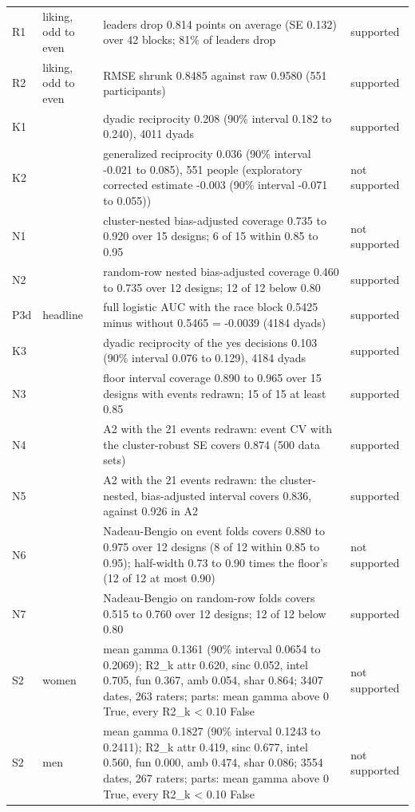 \documentclass[11pt]{article}
\begin{document}
\begin{longtable}{lL{2.6cm}L{9.6cm}l}
R1 & liking, odd to even & leaders drop 0.814 points on average (SE 0.132) over 42 blocks; 81\% of leaders drop & supported \\
R2 & liking, odd to even & RMSE shrunk 0.8485 against raw 0.9580 (551 participants) & supported \\
K1 &  & dyadic reciprocity 0.208 (90\% interval 0.182 to 0.240), 4011 dyads & supported \\
K2 &  & generalized reciprocity 0.036 (90\% interval -0.021 to 0.085), 551 people (exploratory corrected estimate -0.003 (90\% interval -0.071 to 0.055)) & not supported \\
N1 &  & cluster-nested bias-adjusted coverage 0.735 to 0.920 over 15 designs; 6 of 15 within 0.85 to 0.95 & not supported \\
N2 &  & random-row nested bias-adjusted coverage 0.460 to 0.735 over 12 designs; 12 of 12 below 0.80 & supported \\
P3d & headline & full logistic AUC with the race block 0.5425 minus without 0.5465 = -0.0039 (4184 dyads) & supported \\
K3 &  & dyadic reciprocity of the yes decisions 0.103 (90\% interval 0.076 to 0.129), 4184 dyads & supported \\
N3 &  & floor interval coverage 0.890 to 0.965 over 15 designs with events redrawn; 15 of 15 at least 0.85 & supported \\
N4 &  & A2 with the 21 events redrawn: event CV with the cluster-robust SE covers 0.874 (500 data sets) & supported \\
N5 &  & A2 with the 21 events redrawn: the cluster-nested, bias-adjusted interval covers 0.836, against 0.926 in A2 & supported \\
N6 &  & Nadeau-Bengio on event folds covers 0.880 to 0.975 over 12 designs (8 of 12 within 0.85 to 0.95); half-width 0.73 to 0.90 times the floor's (12 of 12 at most 0.90) & not supported \\
N7 &  & Nadeau-Bengio on random-row folds covers 0.515 to 0.760 over 12 designs; 12 of 12 below 0.80 & supported \\
S2 & women & mean gamma 0.1361 (90\% interval 0.0654 to 0.2069); R2\_k attr 0.620, sinc 0.052, intel 0.705, fun 0.367, amb 0.054, shar 0.864; 3407 dates, 263 raters; parts: mean gamma above 0 True, every R2\_k < 0.10 False & not supported \\
S2 & men & mean gamma 0.1827 (90\% interval 0.1243 to 0.2411); R2\_k attr 0.419, sinc 0.677, intel 0.560, fun 0.000, amb 0.474, shar 0.086; 3554 dates, 267 raters; parts: mean gamma above 0 True, every R2\_k < 0.10 False & not supported \\

\end{longtable}
\end{document}
